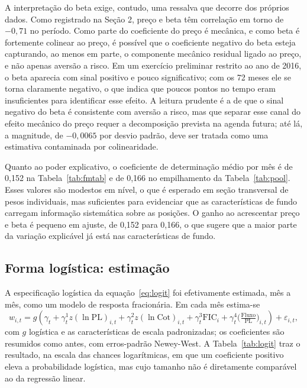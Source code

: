 \documentclass[12pt,a4paper]{article}
\begin{document}
A interpretação do beta exige, contudo, uma ressalva que decorre dos próprios dados. Como
registrado na Seção 2, preço e beta têm correlação em torno de $-0{,}71$ no período. Como parte do
coeficiente do preço é mecânica, e como beta é fortemente colinear ao preço, é possível que o
coeficiente negativo do beta esteja capturando, ao menos em parte, o componente mecânico residual
ligado ao preço, e não apenas aversão a risco. Em um exercício preliminar restrito ao ano de
2016, o beta aparecia com sinal positivo e pouco significativo; com os 72 meses ele se torna
claramente negativo, o que indica que poucos pontos no tempo eram insuficientes para identificar
esse efeito. A leitura prudente é a de que o sinal negativo do beta é consistente com aversão a
risco, mas que separar esse canal do efeito mecânico do preço requer a decomposição prevista na
agenda futura; até lá, a magnitude, de $-0{,}0065$ por desvio padrão, deve ser tratada como uma
estimativa contaminada por colinearidade.

Quanto ao poder explicativo, o coeficiente de determinação médio por mês é de 0,152 na
Tabela~\ref{tab:fmtab} e de 0,166 no empilhamento da Tabela~\ref{tab:pool}. Esses valores são
modestos em nível, o que é esperado em seção transversal de pesos individuais, mas suficientes
para evidenciar que as características de fundo carregam informação sistemática sobre as posições.
O ganho ao acrescentar preço e beta é pequeno em ajuste, de 0,152 para 0,166, o que sugere que a
maior parte da variação explicável já está nas características de fundo.

\subsection{Forma logística: estimação}
\label{sec:est}

A especificação logística da equação~\eqref{eq:logit} foi efetivamente estimada, mês a mês, como
um modelo de resposta fracionária. Em cada mês estima-se
\begin{equation}
w_{i,t} = g\!\left(\gamma_t + \gamma^{1}_t z(\ln\text{PL})_{i,t} + \gamma^{2}_t z(\ln\text{Cot})_{i,t}
        + \gamma^{3}_t \text{FIC}_i + \gamma^{4}_t \big(\tfrac{\text{Fluxo}}{\text{PL}}\big)_{i,t}\right)
        + \varepsilon_{i,t},
\label{eq:logitcs}
\end{equation}
com $g$ logística e as características de escala padronizadas; os coeficientes são resumidos como
antes, com erros-padrão Newey-West. A Tabela~\ref{tab:logit} traz o resultado, na escala das
chances logarítmicas, em que um coeficiente positivo eleva a probabilidade logística, mas cujo
tamanho não é diretamente comparável ao da regressão linear.
\end{document}
